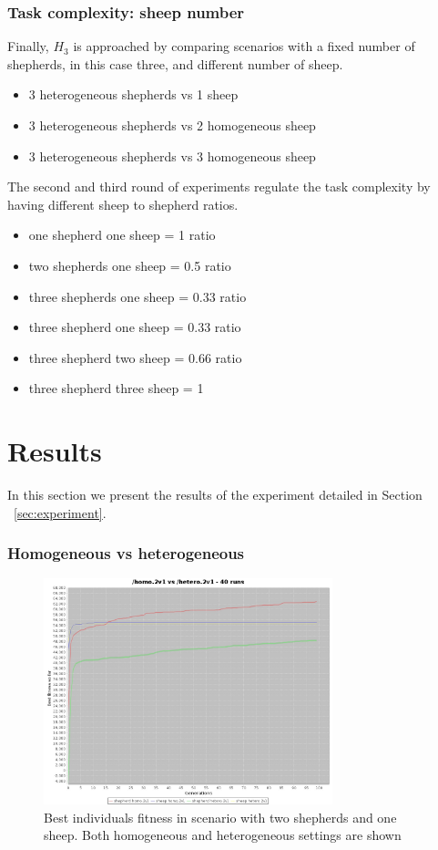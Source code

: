 \documentclass[conference]{IEEEtran}
\begin{document}
\subsubsection{Task complexity: sheep number}
Finally, $H_3$ is approached by comparing scenarios with a fixed number of shepherds, in this case three, and different number of sheep. 
\begin{itemize}
	\item 3 heterogeneous shepherds vs 1 sheep
	\item 3 heterogeneous shepherds vs 2 homogeneous sheep
	\item 3 heterogeneous shepherds vs 3 homogeneous sheep
\end{itemize}
The second and third round of experiments regulate the task complexity by having different sheep to shepherd ratios. 
\begin{itemize}
	\item one shepherd one sheep = 1 ratio
	\item two shepherds one sheep = 0.5 ratio
	\item three shepherds one sheep = 0.33 ratio
	
	\item three shepherd one sheep = 0.33 ratio
	\item three shepherd two sheep = 0.66 ratio
	\item three shepherd three sheep = 1
\end{itemize}


\section{Results}
In this section we present the results of the experiment detailed in Section ~\ref{sec:experiment}.

\vspace{0.5em}
\subsubsection{Homogeneous vs heterogeneous}
\begin{figure}[ht]
	\centering
	\includegraphics[width=3.3in]{imgs/homo2v1-hetero2v1-bestSoFar.jpeg}
	\caption{Best individuals fitness in scenario with two shepherds and one sheep. Both homogeneous and heterogeneous settings are shown}
	\label{fig:2v1_homo_vs_hetero}
\end{figure}
\end{document}
